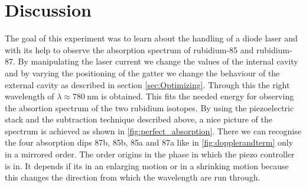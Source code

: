 \section{Discussion}
\label{sec:Diskussion}

The goal of this experiment was to learn about the handling of a diode laser and with its help to observe the absorption spectrum of rubidium-85 and rubidium-87.
By manipulating the laser current we change the values of the internal cavity and by varying the positioning of the gatter we change the behaviour of the external cavity as described in section \ref{sec:Optimizing}. Through this the right wavelength of $\lambda \approx \SI{780}{\nano\meter}$ is obtained. This fits the needed energy for observing the absortion spectrum of the two rubidium isotopes. By using the piezoelectric stack and the subtraction technique described above, a nice picture of the spectrum is achieved as shown in \ref{fig:perfect_absorption}. There we can recognise the four absorption dips 87b, 85b, 85a and 87a like in \ref{fig:dopplerandterm} only in a mirrored order. The order origins in the phase in which the piezo controller is in. It depends if its in an enlarging motion or in a shrinking motion because this changes the direction from which the wavelength are run through.
